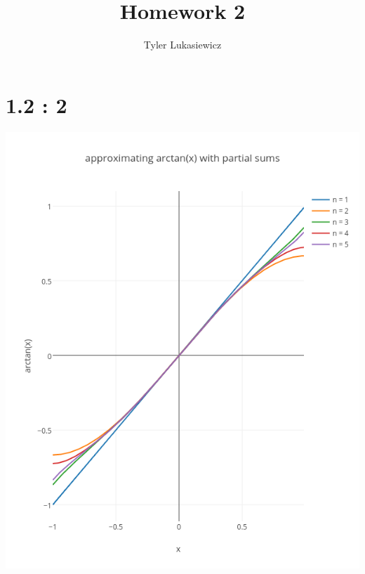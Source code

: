 \documentclass{article}
\title{Homework 2}
\author{Tyler Lukasiewicz}
\begin{document}
\maketitle
\section*{1.2 : 2}
\label{sec:2.2 : 2}
\includegraphics[scale=.5]{images/partial.png}
\end{document}
